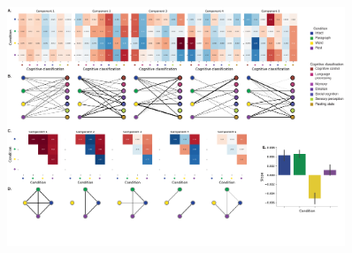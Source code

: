 \documentclass[english, 11pt]{article}
\begin{document}
\begin{figure}[tp]
  \centering
  \includegraphics[width=0.9\textwidth]{figs/components_neurosynth_summary}


\end{figure}
\end{document}
